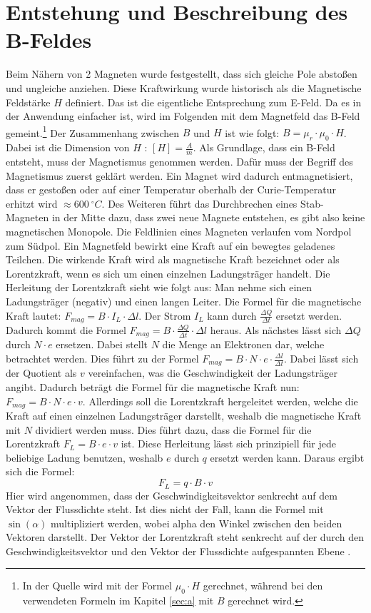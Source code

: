 \section{Entstehung und Beschreibung des B-Feldes}
Beim Nähern von 2 Magneten wurde festgestellt, dass sich gleiche Pole abstoßen und ungleiche anziehen.
Diese Kraftwirkung wurde historisch als die Magnetische Feldstärke $H$ definiert.
Das ist die eigentliche Entsprechung zum E-Feld.
Da es in der Anwendung einfacher ist, wird im Folgenden mit dem Magnetfeld das B-Feld gemeint.\footnote{In der Quelle \cite{Gente1950} wird mit der Formel $\mu_0 \cdot H$ gerechnet, während bei den verwendeten Formeln im Kapitel \ref{sec:a} mit $B$ gerechnet wird.}
Der Zusammenhang zwischen $B$ und $H$ ist wie folgt: $B = \mu_r \cdot \mu_0 \cdot H$.
Dabei ist die Dimension von $H$ : $[H] = \frac{A}{m}$.
Als Grundlage, dass ein B-Feld entsteht, muss der Magnetismus genommen werden.
Dafür muss der Begriff des Magnetismus zuerst geklärt werden.
Ein Magnet wird dadurch entmagnetisiert, dass er gestoßen oder auf einer Temperatur oberhalb der Curie-Temperatur erhitzt wird $ \approx 600 ~ ^\circ C$.
Des Weiteren führt das Durchbrechen eines Stab-Magneten in der Mitte dazu, dass zwei neue Magnete entstehen, es gibt also keine magnetischen Monopole.
Die Feldlinien eines Magneten verlaufen vom Nordpol zum Südpol.
Ein Magnetfeld bewirkt eine Kraft auf ein bewegtes geladenes Teilchen.
Die wirkende Kraft wird als magnetische Kraft bezeichnet oder als Lorentzkraft, wenn es sich um einen einzelnen Ladungsträger handelt.
Die Herleitung der Lorentzkraft sieht wie folgt aus:
Man nehme sich einen Ladungsträger (negativ) und einen langen Leiter.
Die Formel für die magnetische Kraft lautet: $F_{mag} =  B \cdot I_L \cdot \Delta l$.
Der Strom $I_L$ kann durch $\frac{\Delta Q}{\Delta t}$ ersetzt werden.
Dadurch kommt die Formel $F_{mag} = B \cdot \frac{\Delta Q}{\Delta t} \cdot \Delta l$ heraus.
Als nächstes lässt sich $\Delta Q$ durch $N \cdot e$ ersetzen.
Dabei stellt $N$ die Menge an Elektronen dar, welche betrachtet werden.
Dies führt zu der Formel $F_{mag} = B \cdot N \cdot e \cdot \frac{\Delta l}{\Delta t}$.
Dabei lässt sich der Quotient als $v$ vereinfachen, was die Geschwindigkeit der Ladungsträger angibt.
Dadurch beträgt die Formel für die magnetische Kraft nun: $F_{mag} = B \cdot N \cdot e \cdot v$.
Allerdings soll die Lorentzkraft hergeleitet werden, welche die Kraft auf einen einzelnen Ladungsträger darstellt, weshalb die magnetische Kraft mit $N$ dividiert werden muss.
Dies führt dazu, dass die Formel für die Lorentzkraft $F_L = B \cdot e \cdot v$ ist.
Diese Herleitung lässt sich prinzipiell für jede beliebige Ladung benutzen, weshalb $e$ durch $q$ ersetzt werden kann.
Daraus ergibt sich die Formel:
\begin{equation*}
    F_L = q \cdot B \cdot v
\end{equation*}
Hier wird angenommen, dass der Geschwindigkeitsvektor senkrecht auf dem Vektor der Flussdichte steht.
Ist dies nicht der Fall, kann die Formel mit $\sin(\alpha)$ multipliziert werden, wobei alpha den Winkel zwischen den beiden Vektoren darstellt.
Der Vektor der Lorentzkraft steht senkrecht auf der durch den Geschwindigkeitsvektor und den Vektor der Flussdichte aufgespannten Ebene \cite{Lorentzkraft}.

